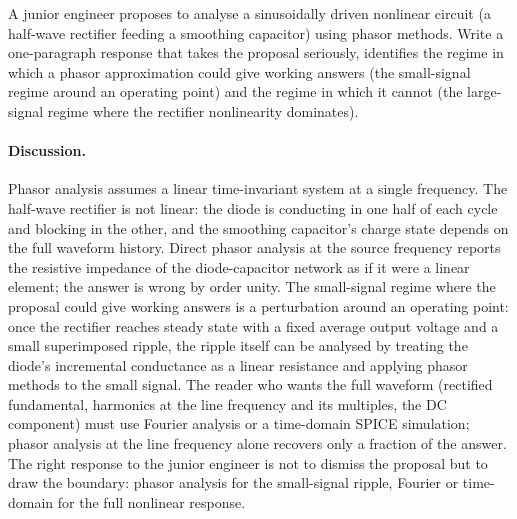 \begin{exercise}
A junior engineer proposes to analyse a sinusoidally driven
nonlinear circuit (a half-wave rectifier feeding a smoothing
capacitor) using phasor methods. Write a one-paragraph response
that takes the proposal seriously, identifies the regime in
which a phasor approximation could give working answers (the
small-signal regime around an operating point) and the regime
in which it cannot (the large-signal regime where the rectifier
nonlinearity dominates).

\paragraph{Discussion.}
Phasor analysis assumes a linear time-invariant system at a
single frequency. The half-wave rectifier is not linear:
the diode is conducting in one half of each cycle and blocking in
the other, and the smoothing capacitor's charge state depends on
the full waveform history. Direct phasor analysis at the source
frequency reports the resistive impedance of the diode-capacitor
network as if it were a linear element; the answer is wrong by
order unity. The small-signal regime where the proposal could
give working answers is a perturbation around an operating point:
once the rectifier reaches steady state with a fixed average
output voltage and a small superimposed ripple, the ripple itself
can be analysed by treating the diode's incremental conductance
as a linear resistance and applying phasor methods to the small
signal. The reader who wants the full waveform (rectified
fundamental, harmonics at the line frequency and its multiples,
the DC component) must use Fourier analysis or a time-domain
SPICE simulation; phasor analysis at the line frequency alone
recovers only a fraction of the answer. The right response to
the junior engineer is not to dismiss the proposal but to draw
the boundary: phasor analysis for the small-signal ripple,
Fourier or time-domain for the full nonlinear response.
\end{exercise}

